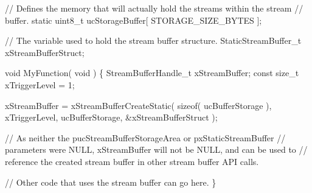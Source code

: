 \begin{DoxyPre}// Defines the memory that will actually hold the streams within the stream
// buffer.
static uint8\_t ucStorageBuffer[ STORAGE\_SIZE\_BYTES ];\end{DoxyPre}



\begin{DoxyPre}// The variable used to hold the stream buffer structure.
StaticStreamBuffer\_t xStreamBufferStruct;\end{DoxyPre}



\begin{DoxyPre}void MyFunction( void )
\{
StreamBufferHandle\_t xStreamBuffer;
const size\_t xTriggerLevel = 1;\end{DoxyPre}



\begin{DoxyPre}    xStreamBuffer = xStreamBufferCreateStatic( sizeof( ucBufferStorage ),
                                               xTriggerLevel,
                                               ucBufferStorage,
                                               \&xStreamBufferStruct );\end{DoxyPre}



\begin{DoxyPre}    // As neither the pucStreamBufferStorageArea or pxStaticStreamBuffer
    // parameters were NULL, xStreamBuffer will not be NULL, and can be used to
    // reference the created stream buffer in other stream buffer API calls.\end{DoxyPre}



\begin{DoxyPre}    // Other code that uses the stream buffer can go here.
\}\end{DoxyPre}



\begin{DoxyPre}\end{DoxyPre}
 